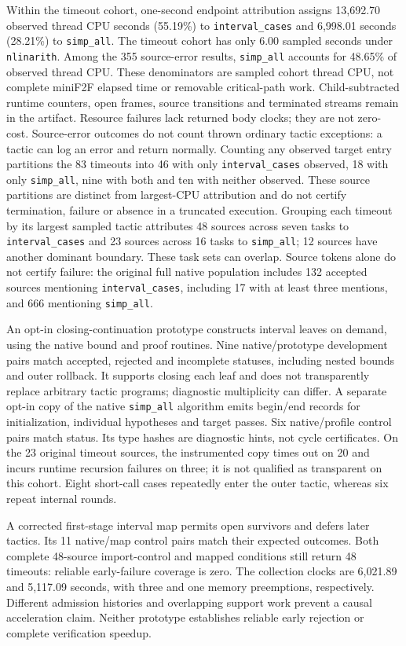 \documentclass[10pt,twocolumn]{article}
\begin{document}
Within the timeout cohort, one-second endpoint attribution assigns
13,692.70 observed thread CPU seconds (55.19\%) to
\texttt{interval\_cases} and 6,998.01 seconds (28.21\%) to
\texttt{simp\_all}. The timeout cohort has only 6.00 sampled seconds under
\texttt{nlinarith}. Among the 355 source-error results, \texttt{simp\_all}
accounts for 48.65\% of observed thread CPU. These denominators are
sampled cohort thread CPU, not complete miniF2F elapsed time or removable
critical-path work. Child-subtracted runtime counters, open frames,
source transitions and terminated streams remain in the artifact.
Resource failures lack returned body clocks; they are not zero-cost.
Source-error outcomes do not count thrown ordinary tactic exceptions: a tactic
can log an error and return normally. Counting any observed target entry
partitions the 83 timeouts into 46 with only \texttt{interval\_cases} observed,
18 with only \texttt{simp\_all}, nine with both and ten with neither observed.
These source partitions are distinct from largest-CPU attribution and do not
certify termination, failure or absence in a truncated execution.
Grouping each timeout by its largest sampled tactic attributes
48 sources across seven tasks to \texttt{interval\_cases} and
23 sources across 16 tasks to \texttt{simp\_all}; 12 sources have another
dominant boundary. These task sets can overlap. Source tokens alone do not
certify failure: the original full native population includes 132 accepted
sources mentioning \texttt{interval\_cases}, including 17 with at least
three mentions, and 666 mentioning \texttt{simp\_all}.

An opt-in closing-continuation prototype constructs interval leaves on demand,
using the native bound and proof routines. Nine native/prototype development
pairs match accepted, rejected and incomplete statuses, including nested
bounds and outer rollback. It supports closing each leaf and does not
transparently replace arbitrary tactic programs; diagnostic multiplicity can
differ. A separate opt-in copy of the native \texttt{simp\_all} algorithm emits
begin/end records for initialization, individual hypotheses and target passes.
Six native/profile control pairs match status. Its type hashes are diagnostic
hints, not cycle certificates. On the 23 original timeout sources, the
instrumented copy times out on 20 and incurs runtime recursion failures on
three; it is not qualified as transparent on this cohort. Eight short-call
cases repeatedly enter the outer tactic, whereas six repeat internal rounds.

A corrected first-stage interval map permits open survivors and defers later
tactics. Its 11 native/map control pairs match their expected outcomes.
Both complete 48-source import-control and mapped conditions still return
48 timeouts: reliable early-failure coverage is zero. The collection clocks
are 6,021.89 and 5,117.09 seconds, with three and one memory preemptions,
respectively. Different admission histories and overlapping support work
prevent a causal acceleration claim. Neither prototype establishes reliable
early rejection or complete verification speedup.
\end{document}
